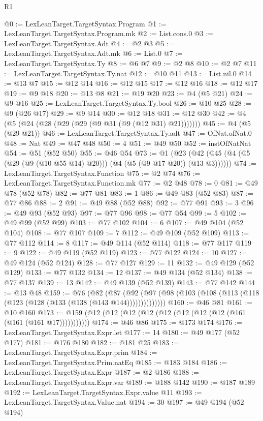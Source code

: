 \begin{lexlean}{R1}
\begin{coremodule}
@0 := LexLeanTarget.TargetSyntax.Program
@1 := LexLeanTarget.TargetSyntax.Program.mk
@2 := List.cons.{0}
@3 := LexLeanTarget.TargetSyntax.Adt
@4 := @2 @3
@5 := LexLeanTarget.TargetSyntax.Adt.mk
@6 := List.{0}
@7 := LexLeanTarget.TargetSyntax.Ty
@8 := @6 @7
@9 := @2 @8
@10 := @2 @7
@11 := LexLeanTarget.TargetSyntax.Ty.nat
@12 := @10 @11
@13 := List.nil.{0}
@14 := @13 @7
@15 := @12 @14
@16 := @12 @15
@17 := @12 @16
@18 := @12 @17
@19 := @9 @18
@20 := @13 @8
@21 := @19 @20
@23 := @4 (@5 @21)
@24 := @9 @16
@25 := LexLeanTarget.TargetSyntax.Ty.bool
@26 := @10 @25
@28 := @9 (@26 @17)
@29 := @9 @14
@30 := @12 @18
@31 := @12 @30
@42 := @4 (@5 (@24 (@28 (@29 (@29 (@9 @31 (@9 (@12 @31) @21)))))))
@45 := @4 (@5 (@29 @21))
@46 := LexLeanTarget.TargetSyntax.Ty.adt
@47 := OfNat.ofNat.{0}
@48 := Nat
@49 := @47 @48
@50 := 4
@51 := @49 @50
@52 := instOfNatNat
@54 := @51 (@52 @50)
@55 := @46 @54
@73 := @1 (@23 (@42 (@45 (@4 (@5 (@29 (@9 (@10 @55 @14) @20))) (@4 (@5 (@9 @17 @20)) (@13 @3))))))
@74 := LexLeanTarget.TargetSyntax.Function
@75 := @2 @74
@76 := LexLeanTarget.TargetSyntax.Function.mk
@77 := @2 @48
@78 := 0
@81 := @49 @78 (@52 @78)
@82 := @77 @81
@83 := 1
@86 := @49 @83 (@52 @83)
@87 := @77 @86
@88 := 2
@91 := @49 @88 (@52 @88)
@92 := @77 @91
@93 := 3
@96 := @49 @93 (@52 @93)
@97 := @77 @96
@98 := @77 @54
@99 := 5
@102 := @49 @99 (@52 @99)
@103 := @77 @102
@104 := 6
@107 := @49 @104 (@52 @104)
@108 := @77 @107
@109 := 7
@112 := @49 @109 (@52 @109)
@113 := @77 @112
@114 := 8
@117 := @49 @114 (@52 @114)
@118 := @77 @117
@119 := 9
@122 := @49 @119 (@52 @119)
@123 := @77 @122
@124 := 10
@127 := @49 @124 (@52 @124)
@128 := @77 @127
@129 := 11
@132 := @49 @129 (@52 @129)
@133 := @77 @132
@134 := 12
@137 := @49 @134 (@52 @134)
@138 := @77 @137
@139 := 13
@142 := @49 @139 (@52 @139)
@143 := @77 @142
@144 := @13 @48
@159 := @76
    (@82
      (@87 (@92 (@97 (@98 (@103 (@108 (@113 (@118 (@123 (@128 (@133 (@138 (@143 @144))))))))))))))
@160 := @46 @81
@161 := @10 @160
@173 := @159 (@12 (@12 (@12 (@12 (@12 (@12 (@12 (@12 (@161 (@161 (@161 @17)))))))))))
@174 := @46 @86
@175 := @173 @174
@176 := LexLeanTarget.TargetSyntax.Expr.let
@177 := 14
@180 := @49 @177 (@52 @177)
@181 := @176 @180
@182 := @181 @25
@183 := LexLeanTarget.TargetSyntax.Expr.prim
@184 := LexLeanTarget.TargetSyntax.Prim.natEq
@185 := @183 @184
@186 := LexLeanTarget.TargetSyntax.Expr
@187 := @2 @186
@188 := LexLeanTarget.TargetSyntax.Expr.var
@189 := @188 @142
@190 := @187 @189
@192 := LexLeanTarget.TargetSyntax.Expr.value @11
@193 := LexLeanTarget.TargetSyntax.Value.nat
@194 := 30
@197 := @49 @194 (@52 @194)

\end{coremodule}
\end{lexlean}
